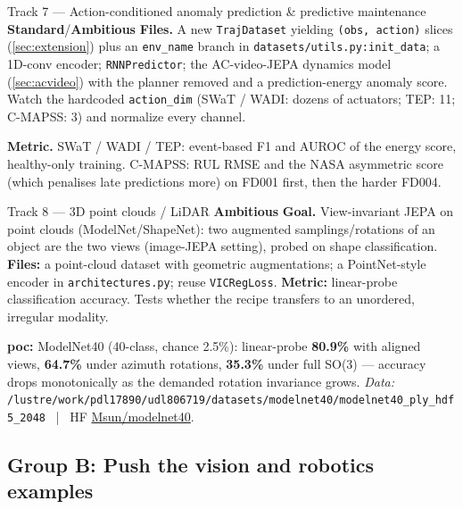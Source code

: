 \documentclass{article}
\newcommand{\code}[1]{\texttt{\small #1}}
\newcommand{\file}[1]{\texttt{\small #1}}
\newcommand{\diffmed}{\colorbox{ebamber!18}{\textcolor{ebamber}{\small\bfseries Standard}}}
\newcommand{\diffhard}{\colorbox{ebred!15}{\textcolor{ebred}{\small\bfseries Ambitious}}}
\begin{document}
\begin{trackbox}{Track 7 --- Action-conditioned anomaly prediction \& predictive maintenance \hfill \diffmed{}/\diffhard{}}
\smallskip
\textbf{Files.} A new \code{TrajDataset} yielding \code{(obs, action)} slices
(\cref{sec:extension}) plus an \code{env\_name} branch in
\file{datasets/utils.py:init\_data}; a 1D-conv encoder; \code{RNNPredictor}; the
AC-video-JEPA dynamics model (\cref{sec:acvideo}) with the planner removed and a
prediction-energy anomaly score. Watch the hardcoded \code{action\_dim}
(SWaT / WADI: dozens of actuators; TEP: 11; C-MAPSS: 3) and normalize every channel.

\smallskip
\textbf{Metric.} SWaT / WADI / TEP: event-based F1 and AUROC of the energy score,
healthy-only training. C-MAPSS: RUL RMSE and the NASA asymmetric score (which
penalises late predictions more) on FD001 first, then the harder FD004.
\end{trackbox}


\begin{trackbox}{Track 8 --- 3D point clouds / LiDAR \hfill \diffhard{}}
\textbf{Goal.} View-invariant JEPA on point clouds (ModelNet/ShapeNet): two
augmented samplings/rotations of an object are the two views (image-JEPA setting),
probed on shape classification. \textbf{Files:} a point-cloud dataset with geometric
augmentations; a PointNet-style encoder in \file{architectures.py}; reuse
\code{VICRegLoss}. \textbf{Metric:} linear-probe classification accuracy. Tests
whether the recipe transfers to an unordered, irregular modality.

\smallskip
\textbf{poc:} ModelNet40 (40-class, chance 2.5\%): linear-probe \textbf{80.9\%} with
aligned views, \textbf{64.7\%} under azimuth rotations, \textbf{35.3\%} under full
SO(3) --- accuracy drops monotonically as the demanded rotation invariance grows.
\emph{Data:} \code{/lustre/work/pdl17890/udl806719/datasets/modelnet40/modelnet40\_ply\_hdf5\_2048}
~|~ HF \href{https://huggingface.co/datasets/Msun/modelnet40}{Msun/modelnet40}.
\end{trackbox}

\subsection{Group B: Push the vision and robotics examples}
\end{document}
